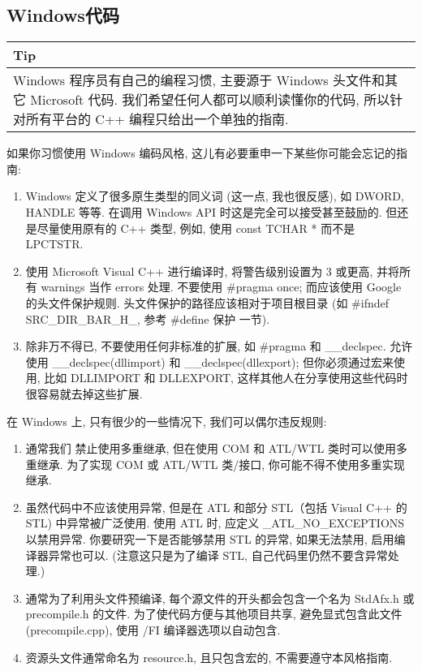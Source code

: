 \documentclass[a4paper,11pt,CJK]{article}
\begin{document}
\begin{CJK}{UTF8}{gbsn}
\subsection{Windows代码}
\begin{table}[htbp]
\flushleft
\begin{tabular}{p{400pt}}
\toprule
\rowcolor[gray]{.8} Tip \\
\midrule
Windows 程序员有自己的编程习惯, 主要源于 Windows 头文件和其它 Microsoft 代码. 我们希望任何人都可以顺利读懂你的代码, 所以针对所有平台的 C++ 编程只给出一个单独的指南.\\
\bottomrule
\end{tabular}
\end{table}
如果你习惯使用 Windows 编码风格, 这儿有必要重申一下某些你可能会忘记的指南:
\begin{enumerate}
\item
Windows 定义了很多原生类型的同义词 (这一点, 我也很反感), 如 DWORD, HANDLE 等等. 在调用 Windows API 时这是完全可以接受甚至鼓励的. 但还是尽量使用原有的 C++ 类型, 例如, 使用 const TCHAR * 而不是 LPCTSTR.
\item
使用 Microsoft Visual C++ 进行编译时, 将警告级别设置为 3 或更高, 并将所有 warnings 当作 errors 处理.
不要使用 \#pragma once; 而应该使用 Google 的头文件保护规则. 头文件保护的路径应该相对于项目根目录 (如 \#ifndef SRC\_DIR\_BAR\_H\_, 参考 \#define 保护 一节).
\item
除非万不得已, 不要使用任何非标准的扩展, 如 \#pragma 和 \_\_declspec. 允许使用 \_\_declspec(dllimport) 和 \_\_declspec(dllexport); 但你必须通过宏来使用, 比如 DLLIMPORT 和 DLLEXPORT, 这样其他人在分享使用这些代码时很容易就去掉这些扩展.
\end{enumerate}
在 Windows 上, 只有很少的一些情况下, 我们可以偶尔违反规则:
\begin{enumerate}
\item
通常我们 禁止使用多重继承, 但在使用 COM 和 ATL/WTL 类时可以使用多重继承. 为了实现 COM 或 ATL/WTL 类/接口, 你可能不得不使用多重实现继承.
\item
虽然代码中不应该使用异常, 但是在 ATL 和部分 STL（包括 Visual C++ 的 STL) 中异常被广泛使用. 使用 ATL 时, 应定义 \_ATL\_NO\_EXCEPTIONS 以禁用异常. 你要研究一下是否能够禁用 STL 的异常, 如果无法禁用, 启用编译器异常也可以. (注意这只是为了编译 STL, 自己代码里仍然不要含异常处理.)
\item
通常为了利用头文件预编译, 每个源文件的开头都会包含一个名为 StdAfx.h 或 precompile.h 的文件. 为了使代码方便与其他项目共享, 避免显式包含此文件 (precompile.cpp), 使用 /FI 编译器选项以自动包含.
\item
资源头文件通常命名为 resource.h, 且只包含宏的, 不需要遵守本风格指南.
\end{enumerate}


\end{CJK}
\end{document}
